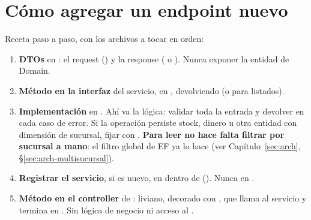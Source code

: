 \section{Cómo agregar un endpoint nuevo}
\label{sec:mt-endpoint-nuevo}

Receta paso a paso, con los archivos a tocar en orden:

\begin{enumerate}
  \item \textbf{DTOs} en \allowbreak {}\allowbreak {}\allowbreak {}: el request () y la response ( o ). Nunca exponer la entidad de Domain.
  \item \textbf{Método en la interfaz} del servicio, en \allowbreak {}\allowbreak {}\allowbreak {}, devolviendo  (o \allowbreak {} para listados).
  \item \textbf{Implementación} en \allowbreak {}\allowbreak {}\allowbreak {}. Ahí va la lógica: validar toda la entrada y devolver  en cada caso de error. Si la operación persiste stock, dinero u otra entidad con dimensión de sucursal, fijar  con \allowbreak {}. \textbf{Para leer no hace falta filtrar por sucursal a mano}: el filtro global de EF ya lo hace (ver Capítulo~\ref{sec:arch}, \S\ref{sec:arch-multisucursal}).
  \item \textbf{Registrar el servicio}, si es nuevo, en \allowbreak {}\allowbreak {}\allowbreak {} dentro de  (\allowbreak {}\allowbreak {}\allowbreak {}). Nunca en .
  \item \textbf{Método en el controller} de \allowbreak {}\allowbreak {}: liviano, decorado con \code{[Authorize(}\allowbreak \code{Policy = "...")]}, que llama al servicio y termina en \allowbreak {}. Sin lógica de negocio ni acceso al .
\end{enumerate}

